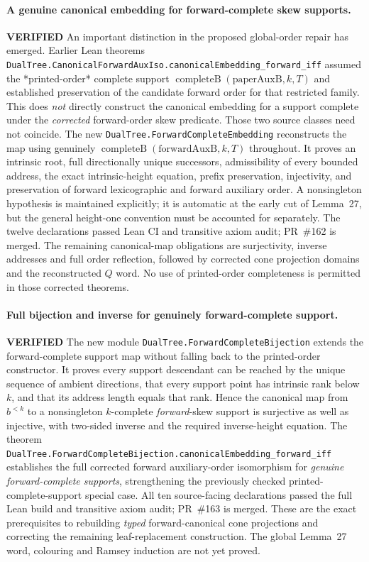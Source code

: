\documentclass[11pt]{article}
\newcommand{\ok}{\textcolor{green!40!black}{\textbf{VERIFIED}}}
\newcommand{\lean}[1]{\texttt{#1}}
\begin{document}
\paragraph{A genuine canonical embedding for forward-complete skew supports.} \ok
An important distinction in the proposed global-order
repair has emerged. Earlier Lean theorems
\lean{DualTree.CanonicalForwardAuxIso.canonicalEmbedding_forward_iff}
assumed the *printed-order* complete support
$\operatorname{completeB}(\mathrm{paperAuxB},k,T)$
and established preservation of the candidate
forward order for that restricted family.
This does \emph{not} directly construct the
canonical embedding for a support complete
under the \emph{corrected} forward-order skew
predicate. Those two source classes need not
coincide.
The new
\lean{DualTree.ForwardCompleteEmbedding}
reconstructs the map using genuinely
$\operatorname{completeB}(\mathrm{forwardAuxB},k,T)$
throughout. It proves an intrinsic root,
full directionally unique successors,
admissibility of every bounded address,
the exact intrinsic-height equation,
prefix preservation, injectivity, and
preservation of forward lexicographic and
forward auxiliary order.
A nonsingleton hypothesis is maintained
explicitly; it is automatic at the early
cut of Lemma~27, but the general height-one
convention must be accounted for separately.
The twelve declarations passed Lean CI and transitive axiom audit; PR~\#162 is merged. The remaining
canonical-map obligations are surjectivity,
inverse addresses and full order reflection,
followed by corrected cone projection
domains and the reconstructed $Q$ word.
No use of printed-order completeness is
permitted in those corrected theorems.

\paragraph{Full bijection and inverse for genuinely forward-complete support.} \ok
The new module
\lean{DualTree.ForwardCompleteBijection}
extends the forward-complete support map without
falling back to the printed-order constructor.
It proves every support descendant can be
reached by the unique sequence of ambient
directions, that every support point has
intrinsic rank below $k$, and that its
address length equals that rank.
Hence the canonical map from $b^{<k}$
to a nonsingleton $k$-complete
\emph{forward}-skew support is
surjective as well as injective, with
two-sided inverse and the required
inverse-height equation.
The theorem
\lean{DualTree.ForwardCompleteBijection.canonicalEmbedding_forward_iff}
establishes the full corrected forward
auxiliary-order isomorphism for
\emph{genuine forward-complete supports},
strengthening the previously checked
printed-complete-support special case.
All ten source-facing declarations passed the full Lean build and
transitive axiom audit; PR~\#163 is merged.
These are the exact prerequisites to
rebuilding \emph{typed} forward-canonical
cone projections and correcting the
remaining leaf-replacement construction.
The global Lemma~27 word, colouring
and Ramsey induction are not yet proved.
\end{document}
